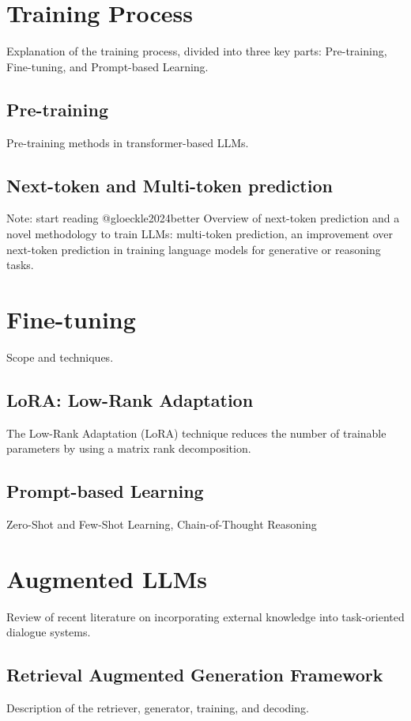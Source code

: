 \section{Training Process}
Explanation of the training process, divided into three key parts: Pre-training, Fine-tuning, and Prompt-based Learning.

\subsection{Pre-training}
Pre-training methods in transformer-based LLMs.

\subsection{Next-token and Multi-token prediction}
Note: start reading @gloeckle2024better \newline
Overview of next-token prediction and a novel methodology to train LLMs: multi-token prediction, an improvement over next-token prediction in training language models for generative or reasoning tasks. 

\section{Fine-tuning}
Scope and techniques.

\subsection{LoRA: Low-Rank Adaptation}
The Low-Rank Adaptation (LoRA) technique reduces the number of trainable parameters by using a matrix rank decomposition.

\subsection{Prompt-based Learning}
Zero-Shot and Few-Shot Learning, Chain-of-Thought Reasoning

\section{Augmented LLMs}
Review of recent literature on incorporating external knowledge into task-oriented dialogue systems.

\subsection{Retrieval Augmented Generation Framework}
Description of the retriever, generator, training, and decoding.

